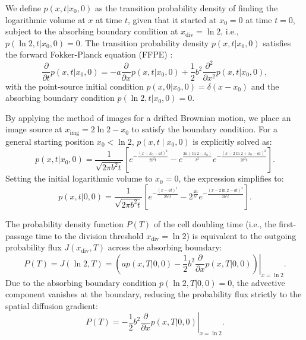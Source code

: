 \documentclass[aps, prl, longbibliography, linenumbers, superscriptaddress]{revtex4-2}
\newcommand{\blue}{\color{blue}}
\newcommand{\blue}{}
\begin{document}
{\blue We define $p(x, t | x_0, 0)$ as the transition probability density of finding the logarithmic volume at $x$ at time $t$, given that it started at $x_0 = 0$ at time $t = 0$, subject to the absorbing boundary condition at $x_{\text{div}} = \ln 2$, i.e., $p(\ln 2, t | x_0, 0) = 0$. The transition probability density $p(x, t | x_0, 0)$ satisfies the forward Fokker-Planck equation (FFPE) \cite{Gardiner2009stochastic}:
\begin{equation}
\frac{\partial}{\partial t} p(x, t | x_0, 0) = -a \frac{\partial}{\partial x} p(x, t | x_0, 0) + \frac{1}{2} b^2 \frac{\partial^2}{\partial x^2} p(x, t | x_0, 0),
\label{eq:ffpe}
\end{equation}
with the point-source initial condition $p(x, 0 | x_0, 0) = \delta(x - x_0)$ and the absorbing boundary condition $p(\ln 2, t | x_0, 0) = 0$.

By applying the method of images for a drifted Brownian motion, {\blue we place an image source at $x_{\text{img}} = 2\ln 2 - x_0$ to satisfy the boundary condition.} For a general starting position $x_0 < \ln 2$, $p(x, t \mid x_0, 0)$ is explicitly solved as:
\begin{equation}
p(x, t | x_0, 0) = \frac{1}{\sqrt{2\pi b^2 t}} \left[ e^{-\frac{(x - x_0 - at)^2}{2b^2 t}} - e^{\frac{2a(\ln 2 - x_0)}{b^2}} e^{-\frac{(x - 2\ln 2 + x_0 - at)^2}{2b^2 t}} \right].
\end{equation}
Setting the initial logarithmic volume to $x_0 = 0$, the expression simplifies to:
\begin{equation}
p(x, t | 0, 0) = \frac{1}{\sqrt{2\pi b^2 t}} \left[ e^{-\frac{(x - at)^2}{2b^2 t}} - 2^{\frac{2a}{b^2}} e^{-\frac{(x - 2\ln 2 - at)^2}{2b^2 t}} \right].
\label{eq:p_transition}
\end{equation}

The probability density function $P(T)$ of the cell doubling time (i.e., the first-passage time to the division threshold $x_{\text{div}} = \ln 2$) is equivalent to the outgoing probability flux $J(x_{\text{div}}, T)$ across the absorbing boundary:
\begin{equation}
P(T) = J(\ln 2, T) = \left. \left( a p(x, T | 0, 0) - \frac{1}{2} b^2 \frac{\partial}{\partial x} p(x, T | 0, 0) \right) \right|_{x = \ln 2}.
\end{equation}
Due to the absorbing boundary condition $p(\ln 2, T | 0, 0) = 0$, the advective component vanishes at the boundary, reducing the probability flux strictly to the spatial diffusion gradient:
\begin{equation}
P(T) = -\left. \frac{1}{2} b^2 \frac{\partial}{\partial x} p(x, T | 0, 0) \right|_{x = \ln 2}.
\label{eq:flux_def}
\end{equation}

}
\end{document}
